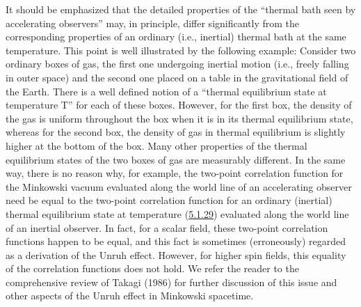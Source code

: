 \documentclass[11pt,a4paper]{article}
\begin{document}
\hypertarget{source-130}{}

It should be emphasized that the detailed properties of the ``thermal bath seen by accelerating observers'' may, in principle, differ significantly from the corresponding properties of an ordinary (i.e., inertial) thermal bath at the same temperature. This point is well illustrated by the following example: Consider two ordinary boxes of gas, the first one undergoing inertial motion (i.e., freely falling in outer space) and the second one placed on a table in the gravitational field of the Earth. There is a well defined notion of a ``thermal equilibrium state at temperature T'' for each of these boxes. However, for the first box, the density of the gas is uniform throughout the box when it is in its thermal equilibrium state, whereas for the second box, the density of gas in thermal equilibrium is slightly higher at the bottom of the box. Many other properties of the thermal equilibrium states of the two boxes of gas are measurably different. In the same way, there is no reason why, for example, the two-point correlation function for the Minkowski vacuum evaluated along the world line of an accelerating observer need be equal to the two-point correlation function for an ordinary (inertial) thermal equilibrium state at temperature (\hyperref[eq:5.1.29]{5.1.29}) evaluated along the world line of an inertial observer. In fact, for a scalar field, these two-point correlation functions happen to be equal, and this fact is sometimes (erroneously) regarded as a derivation of the Unruh effect. However, for higher spin fields, this equality of the correlation functions does not hold. We refer the reader to the comprehensive review of Takagi (1986) for further discussion of this issue and other aspects of the Unruh effect in Minkowski spacetime.
\end{document}
